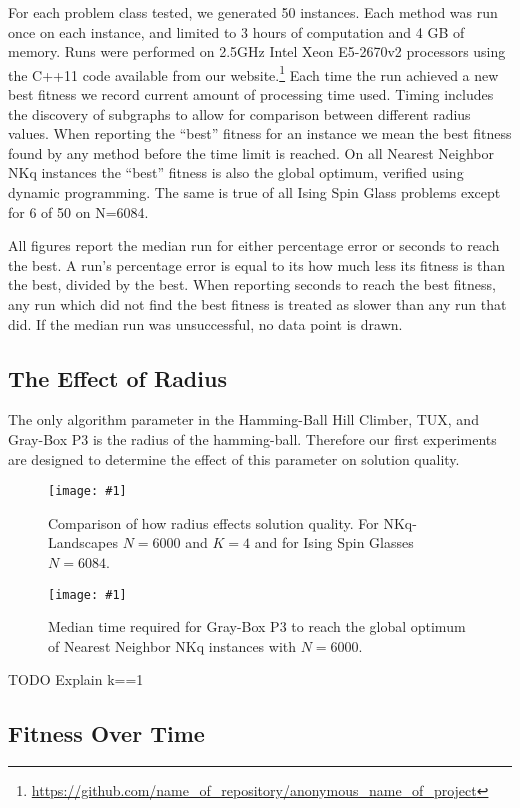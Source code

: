 \documentclass{sig-alternate}
\newcommand{\includegraphicsfit}[1]
{\texttt{[image: \#1]}}
\newcommand{\includegraphicswide}[1]
{\texttt{[image: \#1]}}
\begin{document}
For each problem class tested, we generated 50 instances.
Each method was run once on each instance, and limited to 3 hours of computation and 4 GB of memory.
Runs were performed on 2.5GHz Intel Xeon E5-2670v2 processors using the C++11 code available
from our website.\footnote{\url{https://github.com/name_of_repository/anonymous_name_of_project}}
Each time the run achieved a new best fitness we record current amount of processing time used.
Timing includes the discovery of subgraphs to allow for comparison between different radius values.
When reporting the ``best'' fitness for an instance we mean the best fitness found by any method before
the time limit is reached. On all Nearest Neighbor NKq instances the ``best'' fitness
is also the global optimum, verified using dynamic programming. The same is true of all Ising Spin Glass
problems except for 6 of 50 on N=6084.

All figures report the median run for either percentage error or seconds to reach the best. A run's percentage error is
equal to its how much less its fitness is than the best, divided by the best. When reporting seconds
to reach the best fitness, any run which did not find the best fitness is treated as slower than any run that did.
If the median run was unsuccessful, no data point is drawn.

\subsection{The Effect of Radius}
The only algorithm parameter in the Hamming-Ball Hill Climber, TUX, and Gray-Box P3
is the radius of the hamming-ball. Therefore our first experiments are designed to determine
the effect of this parameter on solution quality.

\begin{figure*}
  \centering
  \includegraphicswide{fitness}
  \caption{Comparison of how radius effects solution quality. For NKq-Landscapes $N=6000$ and $K=4$ and
  for Ising Spin Glasses $N=6084$.}
  \label{fig-fitness}
\end{figure*}

\begin{figure}
  \centering
  \includegraphicsfit{p3-seconds}
  \caption{Median time required for Gray-Box P3 to reach the global optimum of Nearest Neighbor NKq instances with $N=6000$.}
  \label{fig-p3-seconds}
\end{figure}

TODO Explain k==1

\subsection{Fitness Over Time}
\end{document}
